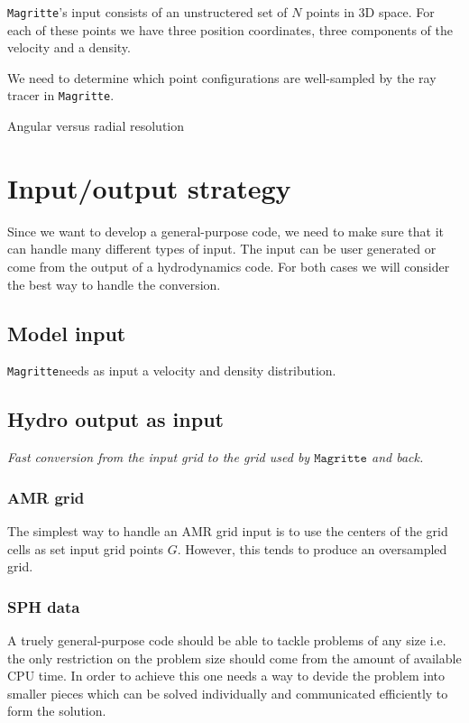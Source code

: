 \documentclass[]{article}
\newcommand{\Magritte}{\texttt{Magritte}}
\begin{document}
\Magritte's input consists of an unstructered set of $N$ points in 3D space. For each of these points we have three position coordinates, three components of the velocity and a density.

\bigskip

We need to determine which point configurations are well-sampled by the ray tracer in \Magritte.

Angular versus radial resolution



\section{Input/output strategy}

Since we want to develop a general-purpose code, we need to make sure that it can handle many different types of input. The input can be user generated or come from the output of a hydrodynamics code. For both cases we will consider the best way to handle the conversion.


\subsection{Model input}

\Magritte needs as input a velocity and density distribution.


\subsection{Hydro output as input}
\bigskip

\emph{Fast conversion from the input grid to the grid used by $\Magritte$ and back.}

\subsubsection{AMR grid}

The simplest way to handle an AMR grid input is to use the centers of the grid cells as set input grid points $G$. However, this tends to produce an oversampled grid.



\subsubsection{SPH data}

A truely general-purpose code should be able to tackle problems of any size i.e. the only restriction on the problem size should come from the amount of available CPU time.  In order to achieve this one needs a way to devide the problem into smaller pieces which can be solved individually and communicated efficiently to form the solution.
\end{document}
